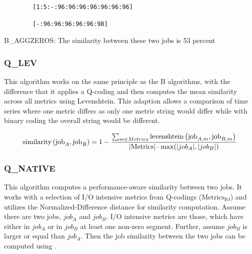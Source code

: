 \documentclass{jhps}
\begin{document}
\begin{listing}
	\noindent\begin{minipage}{0.49\textwidth}
		\begin{lstlisting}
		[1:5:-:96:96:96:96:96:96:96]
		\end{lstlisting}
		\vspace{-2em}
		\label{lst:sim:bin_aggzeros:job_a}
	\end{minipage}
	\noindent\begin{minipage}{0.49\textwidth}
		\begin{lstlisting}
		[-:96:96:96:96:96:98]
		\end{lstlisting}
		\vspace{-2em}
		\label{lst:sim:bin_aggzeros:job_b}
	\end{minipage}
	\caption{B\_AGGZEROS: The similarity between these two jobs is 53 percent}
	\label{lst:sim:bin_aggzeros}
\end{listing}

  \subsubsection{Q\_LEV}
This algorithm works on the same principle as the B algorithms, with the difference that it applies a Q-coding and then computes the mean similarity across all metrics using Levenshtein.
This adaption allows a comparison of time series where one metric differs as only one metric string would differ while with binary coding the overall string would be different.

\begin{equation}
	\text{similarity}\left(\text{job}_{A},\text{job}_{B} \right) = 1 - \frac{ \sum_{m \in Metrics}^{} \text{levenshtein} \left(\text{job}_{A,m},\text{\text{job}}_{B,m} \right) }{|\text{Metrics}| \cdot \max(|job_A|, |job_{B}|)}
\end{equation}

\FloatBarrier
\subsubsection{Q\_NATIVE}
This algorithm computes a performance-aware similarity between two jobs.
It works with a selection of I/O intensive metrics from Q-codings ($\text{Metrics}_{\text{IO}}$) and utilizes the Normalized-Difference distance for similarity computation.
Assume there are two jobs, $job_A$ and $job_B$.
I/O intensive metrics are those, which have either in $job_A$ or in $job_B$ at least one non-zero segment.
Further, assume $job_B$ is larger or equal than $job_A$.
Then the job similarity between the two jobs can be computed using .
\end{document}

